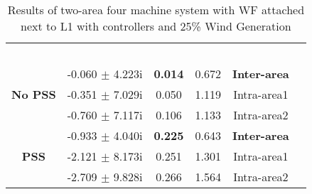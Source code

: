 \documentclass[conference,11pt]{IEEEtran}
\begin{document}
\begin{table}[t]
\centering
\caption{Results of two-area four machine system with WF attached next to L1 with controllers and 25\% Wind Generation}
\label{tab:table4}
\renewcommand{\arraystretch}{1}
\begin{tabular}{||c|c|c|c|c|c||}
\hline
\hline
\multirow{2}{*}{\parbox{1.1cm}{\\}}  & 
\multirow{2}{*}{\parbox{1.4cm}{}} & 
\multirow{2}{*}{\parbox{1.1cm}{}} & 
\multirow{2}{*}{\parbox{0.8cm}{}} & 
\multirow{2}{*}{\parbox{1.2cm}{}}  \\
{}       &      {}     &          {} &      {}     &       {} \\ \hline
\hline  
\multirow{3}{*}{\bf {No PSS}}    &-0.060	$\pm$ 4.223i&	\bf{0.014}&	0.672& \bf{Inter-area}\\ 
{}                                          &-0.351	$\pm$ 7.029i&	0.050&	1.119& Intra-area1\\ 
{}                                          &-0.760	$\pm$ 7.117i&	0.106&	1.133& Intra-area2\\ \hline \hline
\multirow{3}{*}{\bf {PSS}}    &-0.933	$\pm$ 4.040i&	\bf{0.225}&	0.643& \bf{Inter-area}\\
{}                           &-2.121	$\pm$ 8.173i&	0.251&	1.301& Intra-area1\\
{}                          &-2.709	$\pm$ 9.828i&	0.266&	1.564& Intra-area2\\ \hline
\hline
\end{tabular}
\vspace{-0.20in}
\end{table}
\end{document}
